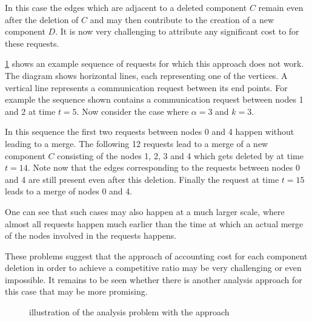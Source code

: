 \documentclass[a4paper, 10pt]{article}
\newcommand{\opt}{\text{O{\scriptsize PT}}}
\newcommand{\coreDel}{\text{C{\scriptsize REP}-C{\scriptsize ORE}}}
\newcommand{\request}[3]{\draw (axis cs:#3,#1) -- node[left]{} (axis cs:#3,#2);}
\theoremstyle{definition}
\begin{document}
	 In this case the edges which are adjacent to a deleted component $C$ remain even after the deletion of $C$ and may then contribute to the creation of a new component $D$. It is now very challenging to attribute any significant cost to \opt{} for these requests.
	 
	 \cref{exNewCrep} shows an example sequence of requests for which this approach does not work. The diagram shows horizontal lines, each representing one of the vertices. A vertical line represents a communication request between its end points. For example the sequence shown contains a communication request between nodes 1 and 2 at time $t=5$. Now consider the case where $\alpha=3$ and $k=3$.
	 
	 In this sequence the first two requests between nodes 0 and 4 happen without leading to a merge. The following 12 requests lead to a merge of a new component $C$ consisting of the nodes 1, 2, 3 and 4 which gets deleted by \coreDel{} at time $t=14$. Note now that the edges corresponding to the requests between nodes 0 and 4 are still present even after this deletion. Finally the request at time $t=15$ leads to a merge of nodes 0 and 4.
	 
	 One can see that such cases may also happen at a much larger scale, where almost all requests happen much earlier than the time at which an actual merge of the nodes involved in the requests happens.
	 
	 These problems suggest that the approach of accounting cost for each component deletion in order to achieve a competitive ratio may be very challenging or even impossible. It remains to be seen whether there is another analysis approach for this case that may be more promising.
	 
	 \begin{figure}
	 	\centering
	 	\caption{illustration of the analysis problem with the approach \coreDel{}}\label{exNewCrep}	
	 \end{figure}
	 
\end{document}
